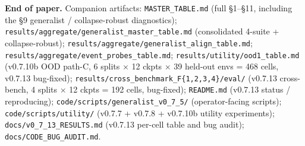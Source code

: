 \documentclass{article}
\begin{document}
\textbf{End of paper.} Companion artifacts: \texttt{MASTER\_TABLE.md} (full §1--§11, including the §9 generalist / collapse-robust diagnostics); \texttt{results/aggregate/generalist\_master\_table.md} (consolidated 4-suite + collapse-robust); \texttt{results/aggregate/generalist\_align\_table.md}; \texttt{results/aggregate/event\_probes\_table.md}; \texttt{results/utility/ood1\_table.md} (v0.7.10b OOD path-C, 6 splits $\times$ 12 ckpts $\times$ 39 held-out envs = 468 cells, v0.7.13 bug-fixed); \texttt{results/cross\_benchmark\_F\{1,2,3,4\}/eval/} (v0.7.13 cross-bench, 4 splits $\times$ 12 ckpts = 192 cells, bug-fixed); \texttt{README.md} (v0.7.13 status / reproducing); \texttt{code/scripts/generalist\_v0\_7\_5/} (operator-facing scripts); \texttt{code/scripts/utility/} (v0.7.7 + v0.7.8 + v0.7.10b utility experiments); \texttt{docs/v0\_7\_13\_RESULTS.md} (v0.7.13 per-cell table and bug audit); \texttt{docs/CODE\_BUG\_AUDIT.md}.
\end{document}
